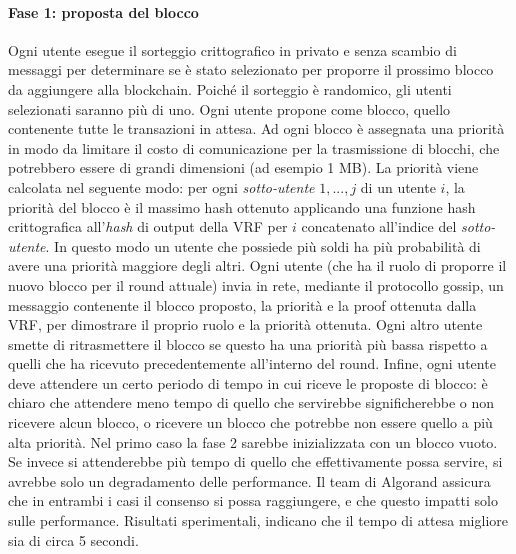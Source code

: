 \paragraph*{Fase 1: proposta del blocco}
Ogni utente esegue il sorteggio crittografico in privato e senza scambio di messaggi per determinare se è stato selezionato per proporre il prossimo blocco da aggiungere alla blockchain. Poiché il sorteggio è randomico, gli utenti selezionati saranno più di uno. Ogni utente propone come blocco, quello contenente tutte le transazioni in attesa. Ad ogni blocco è assegnata una priorità in modo da limitare il costo di comunicazione per la trasmissione di blocchi, che potrebbero essere di grandi dimensioni (ad esempio 1 MB). La priorità viene calcolata nel seguente modo: per ogni \emph{sotto-utente} $1, ..., j$ di un utente $i$, la priorità del blocco è il massimo hash ottenuto applicando una funzione hash crittografica all'\emph{hash} di output della VRF per $i$ concatenato all'indice del \emph{sotto-utente}. In questo modo un utente che possiede più soldi ha più probabilità di avere una priorità maggiore degli altri. Ogni utente (che ha il ruolo di proporre il nuovo blocco per il round attuale) invia in rete, mediante il protocollo gossip, un messaggio contenente il blocco proposto, la priorità e la proof ottenuta dalla VRF, per dimostrare il proprio ruolo e la priorità ottenuta. Ogni altro utente smette di ritrasmettere il blocco se questo ha una priorità più bassa rispetto a quelli che ha ricevuto precedentemente all'interno del round. Infine, ogni utente deve attendere un certo periodo di tempo in cui riceve le proposte di blocco: è chiaro che attendere meno tempo di quello che servirebbe significherebbe o non ricevere alcun blocco, o ricevere un blocco che potrebbe non essere quello a più alta priorità. Nel primo caso la fase 2 sarebbe inizializzata con un blocco vuoto. Se invece si attenderebbe più tempo di quello che effettivamente possa servire, si avrebbe solo un degradamento delle performance. Il team di Algorand assicura che in entrambi i casi il consenso si possa raggiungere, e che questo impatti solo sulle performance. Risultati sperimentali, indicano che il tempo di attesa migliore sia di circa 5 secondi.

